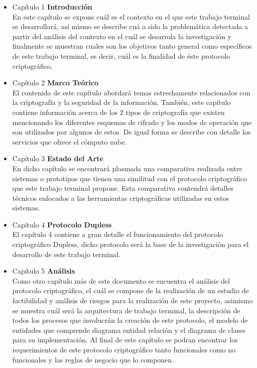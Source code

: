 \begin{itemize}
	\item Capítulo 1 \textbf{Introducción} \\
                     En este capítulo se expone cuál es el contexto en el que este trabajo terminal se desarrollará, así mismo se describe cuá a sido la problemática detectada a partir del análisis del contexto en el cuál se desarrola la investigación y finalmente se muestran cuales son los objetivos tanto general como específicos de este trabajo terminal, es decir, cuál es la finalidad de éste protocolo criptográfico. 

	\item Capítulo 2 \textbf{Marco Teórico} \\
El contenido de este capítulo abordará temas estrechamente relacionados con la criptografía y la seguridad de la información. También, este capítulo contiene información acerca de los 2 tipos de criptografía que existen mencionando los diferentes esquemas de cifrado y los modos de operación que son utilizados por algunos de estos. De igual forma se describe con detalle los servicios que ofrece el cómputo nube. 

	\item Capítulo 3 \textbf{Estado del Arte} \\
	En dicho capítulo se encontrará plasmada una comparativa realizada entre sistemas o prototipos que tienen una similitud con el protocolo criptográfico que este trabajo terminal propone. Esta comparativa contendrá detalles técnicos enfocados a las herramientas criptográficas utilizadas en estos sistemas.

	\item Capítulo 4 \textbf{Protocolo Dupless} \\
            El capítulo 4 contiene a gran detalle el funcionamiento del protocolo criptográfico Dupless, dicho protocolo será la base de la investigación para el desarrollo de este trabajo terminal. 

	\item Capítulo 5 \textbf{Análisis} \\
	Como otro capítulo más de este documento se encuentra el análisis del protocolo criptográfico, el cuál se compone de la realización de un estudio de factibilidad y análisis de riesgos para la realización de este proyecto, asimismo se muestra cuál será la arquitectura de trabajo terminal, la descripción de todos los procesos que involucrán la creación de este protocolo, el modelo de entidades que comprende diagrama entidad relación y el diagrama de clases para su implementación. Al final de este capítulo se podran encontrar los requerimientos de este protocolo criptográfico tanto funcionales como no funcionales y las reglas de negocio que lo componen.


\end{itemize}
